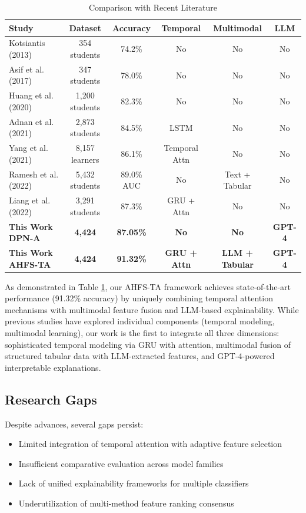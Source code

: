 \documentclass[journal]{IEEEtran}
\begin{document}
\begin{table}[t]
\centering
\caption{Comparison with Recent Literature}
\label{tab:literature_gap}
\begin{tabular}{lccccc}
\toprule
\textbf{Study} & \textbf{Dataset} & \textbf{Accuracy} & \textbf{Temporal} & \textbf{Multimodal} & \textbf{LLM} \\
\midrule
Kotsiantis (2013) & 354 students & 74.2\% & No & No & No \\
Asif et al. (2017) & 347 students & 78.0\% & No & No & No \\
Huang et al. (2020) & 1,200 students & 82.3\% & No & No & No \\
Adnan et al. (2021) & 2,873 students & 84.5\% & LSTM & No & No \\
Yang et al. (2021) & 8,157 learners & 86.1\% & Temporal Attn & No & No \\
Ramesh et al. (2022) & 5,432 students & 89.0\% AUC & No & Text + Tabular & No \\
Liang et al. (2022) & 3,291 students & 87.3\% & GRU + Attn & No & No \\
\midrule
\textbf{This Work DPN-A} & \textbf{4,424} & \textbf{87.05\%} & \textbf{No} & \textbf{No} & \textbf{GPT-4} \\
\textbf{This Work AHFS-TA} & \textbf{4,424} & \textbf{91.32\%} & \textbf{GRU + Attn} & \textbf{LLM + Tabular} & \textbf{GPT-4} \\
\bottomrule
\end{tabular}
\end{table}

As demonstrated in Table \ref{tab:literature_gap}, our AHFS-TA framework achieves state-of-the-art performance (91.32\% accuracy) by uniquely combining temporal attention mechanisms with multimodal feature fusion and LLM-based explainability. While previous studies have explored individual components (temporal modeling, multimodal learning), our work is the first to integrate all three dimensions: sophisticated temporal modeling via GRU with attention, multimodal fusion of structured tabular data with LLM-extracted features, and GPT-4-powered interpretable explanations.

\subsection{Research Gaps}

Despite advances, several gaps persist:
\begin{itemize}
\item Limited integration of temporal attention with adaptive feature selection
\item Insufficient comparative evaluation across model families
\item Lack of unified explainability frameworks for multiple classifiers
\item Underutilization of multi-method feature ranking consensus
\end{itemize}
\end{document}
